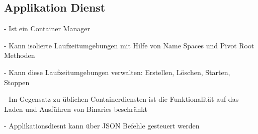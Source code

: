 \subsection*{Applikation Dienst}

- Ist ein Container Manager 

- Kann isolierte Laufzeitumgebungen mit Hilfe von Name Spaces und Pivot Root Methoden 

- Kann diese Laufzeitumgebungen verwalten: Erstellen, Löschen, Starten, Stoppen 

- Im Gegensatz zu üblichen Containerdiensten ist die Funktionalität auf das Laden und Ausführen von Binaries beschränkt 

- Applikationsdiesnt kann über JSON Befehle gesteuert werden 

\clearpage